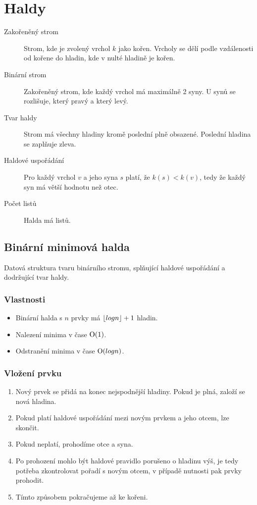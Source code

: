 \section{Haldy}

  \begin{description}
    \item[Zakořeněný strom] Strom, kde je zvolený vrchol $k$ jako kořen. Vrcholy se dělí podle vzdálenosti od kořene do hladin, kde v nulté hladině je kořen.
    \item[Binární strom] Zakořeněný strom, kde každý vrchol má maximálně 2 syny. U synů se rozlišuje, který pravý a který levý.
    \item[Tvar haldy] Strom má všechny hladiny kromě poslední plně obsazené. Poslední hladina se zaplňuje zleva.
    \item[Haldové uspořádání] Pro každý vrchol $v$ a jeho syna $s$ platí, že $k(s) < k(v)$, tedy že každý syn má větší hodnotu než otec.
    \item[Počet listů] Halda má  listů.
  \end{description}

  \subsection{Binární minimová halda}
  Datová struktura tvaru binárního stromu, splňující haldové uspořádání a dodržující tvar haldy.

    \subsubsection{Vlastnosti}
      \begin{itemize}
        \item Binární halda s $n$ prvky má $\lfloor log n\rfloor + 1$ hladin.
        \item Nalezení minima v čase $\textrm O(1)$.
        \item Odstranění minima v čase $\textrm O(log n)$.
      \end{itemize}

    \subsubsection{Vložení prvku}
      \begin{enumerate}
        \item Nový prvek se přidá na konec nejspodnější hladiny. Pokud je plná, založí se nová hladina.
        \item Pokud platí haldové uspořádání mezi novým prvkem a jeho otcem, lze skončit.
        \item Pokud neplatí, prohodíme otce a syna.
        \item Po prohození mohlo být haldové pravidlo porušeno o hladinu výš, je tedy potřeba zkontrolovat pořadí s novým otcem, v případě nutnosti pak prvky prohodit.
        \item Tímto způsobem pokračujeme až ke kořeni.
      \end{enumerate}

